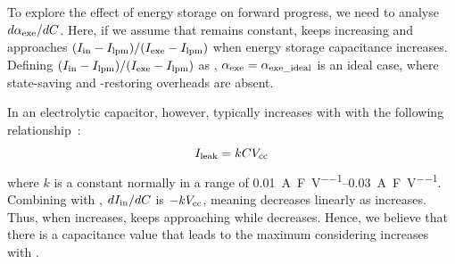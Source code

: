 To explore the effect of energy storage on forward progress, we need to analyse $d\alpha_{\text{exe}} / dC$. Here, if we assume that  remains constant,  keeps increasing and approaches $(I_{\text{in}} - I_{\text{lpm}}) / (I_{\text{exe}} - I_{\text{lpm}})$ when energy storage capacitance  increases. Defining $(I_{\text{in}} - I_{\text{lpm}}) / (I_{\text{exe}} - I_{\text{lpm}})$ as , $\alpha_{\text{exe}} = \alpha_{\text{exe\_ideal}}$ is an ideal case, where state-saving and -restoring overheads are absent.

In an electrolytic capacitor, however,  typically increases with  with the following relationship~\cite{avxleakage}:
\begin{equation}
    I_{\text{leak}} = kCV_{\text{cc}}
    \label{eq:ileak}
\end{equation}
where $k$ is a constant normally in a range of \SIrange{0.01}{0.03}{\ampere\per\farad\per\volt}. Combining  with , $dI_{\text{in}} / dC$ is $-kV_{\text{cc}}$, meaning  decreases linearly as  increases. Thus, when  increases,  keeps approaching  while  decreases. Hence, we believe that there is a capacitance value that leads to the maximum  considering  increases with .
